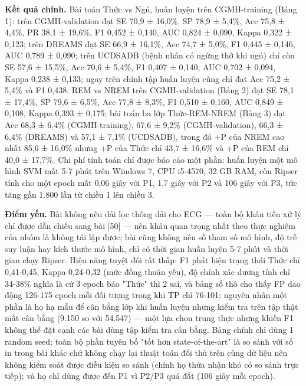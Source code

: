 \documentclass[12pt,a4paper]{article}
\begin{document}
\noindent \textbf{Kết quả chính.} Bài toán Thức vs Ngủ, huấn luyện trên CGMH-training (Bảng 1): trên CGMH-validation đạt SE 70,9 ± 16,0\%, SP 78,9 ± 5,4\%, Acc 75,8 ± 4,4\%, PR 38,1 ± 19,6\%, F1 0,452 ± 0,140, AUC 0,824 ± 0,090, Kappa 0,322 ± 0,123; trên DREAMS đạt SE 66,9 ± 16,1\%, Acc 74,7 ± 5,0\%, F1 0,445 ± 0,146, AUC 0,789 ± 0,090; trên UCDSADB (bệnh nhân có ngừng thở khi ngủ) chỉ còn SE 57,6 ± 15,5\%, Acc 70,6 ± 5,4\%, F1 0,407 ± 0,140, AUC 0,702 ± 0,094, Kappa 0,238 ± 0,133; ngay trên chính tập huấn luyện cũng chỉ đạt Acc 75,2 ± 5,4\% và F1 0,438. REM vs NREM trên CGMH-validation (Bảng 2) đạt SE 78,1 ± 17,4\%, SP 79,6 ± 6,5\%, Acc 77,8 ± 8,3\%, F1 0,510 ± 0,160, AUC 0,849 ± 0,108, Kappa 0,393 ± 0,175; bài toán ba lớp Thức-REM-NREM (Bảng 3) đạt Acc 68,3 ± 6,4\% (CGMH-training), 67,6 ± 9,2\% (CGMH-validation), 66,3 ± 6,4\% (DREAMS) và 57,1 ± 7,1\% (UCDSADB), trong đó +P của NREM cao nhất 85,6 ± 16,0\% nhưng +P của Thức chỉ 43,7 ± 16,6\% và +P của REM chỉ 40,0 ± 17,7\%. Chi phí tính toán chỉ được báo cáo một phần: huấn luyện một mô hình SVM mất 5-7 phút trên Windows 7, CPU i5-4570, 32 GB RAM, còn Ripser tính cho một epoch mất 0,06 giây với P1, 1,7 giây với P2 và 106 giây với P3, tức tăng gần 1.800 lần từ chiều 1 lên chiều 3.\par\vspace{3pt}
\noindent \textbf{Điểm yếu.} Bài không nêu dải lọc thông dải cho ECG — toàn bộ khâu tiền xử lý chỉ được dẫn chiếu sang bài [50] — nên khâu quan trọng nhất theo thực nghiệm của nhóm là không tái lập được; bài cũng không nêu số tham số mô hình, độ trễ suy luận hay kích thước mô hình, chỉ có thời gian huấn luyện 5-7 phút và thời gian chạy Ripser. Hiệu năng tuyệt đối rất thấp: F1 phát hiện trạng thái Thức chỉ 0,41-0,45, Kappa 0,24-0,32 (mức đồng thuận yếu), độ chính xác dương tính chỉ 34-38\% nghĩa là cứ 3 epoch báo "Thức" thì 2 sai, và bảng số thô cho thấy FP dao động 126-175 epoch mỗi đối tượng trong khi TP chỉ 76-101; nguyên nhân một phần là họ hạ mẫu để cân bằng lớp khi huấn luyện nhưng kiểm tra trên tập thật mất cân bằng (9.150 so với 54.547) — một lựa chọn trung thực nhưng khiến F1 không thể đặt cạnh các bài dùng tập kiểm tra cân bằng. Bảng chính chỉ dùng 1 random seed; toàn bộ phần tuyên bố "tốt hơn state-of-the-art" là so sánh với số in trong bài khác chứ không chạy lại thuật toán đối thủ trên cùng dữ liệu nên không kiểm soát được điều kiện so sánh (chính họ thừa nhận khó có so sánh trực tiếp); và họ chỉ dùng được đến P1 vì P2/P3 quá đắt (106 giây mỗi epoch).\par\vspace{3pt}
\end{document}

